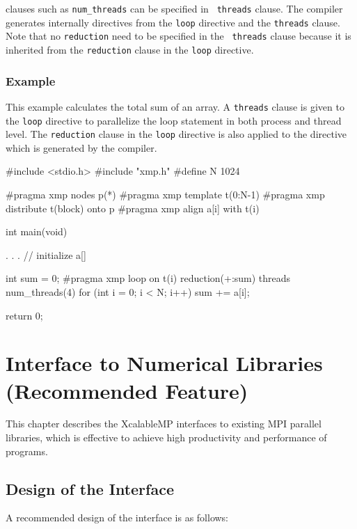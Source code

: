    {\OMP} clauses such as {\tt num\_threads} can be specified in {\tt
   threads} clause.
   The {\XMP} compiler generates internally {\OMP} directives from the
   {\tt loop} directive and the {\tt threads} clause.
   Note that no {\tt reduction} need to be specified in the {\tt
   threads} clause because it is inherited from the {\tt reduction}
   clause in the {\tt loop} directive.

\subsection*{Example}

   This example calculates the total sum of an array.
   A {\tt threads} clause is given to the {\tt loop} directive to
   parallelize the loop statement in both process and
   thread level. 
   The {\tt reduction} clause in the {\tt loop} directive is also
   applied to the {\OMP} directive which is generated by the {\XMP}
   compiler.

\begin{XCexample}
#include <stdio.h>
#include "xmp.h"
#define N 1024

#pragma xmp nodes p(*)
#pragma xmp template t(0:N-1)
#pragma xmp distribute t(block) onto p
#pragma xmp align a[i] with t(i)

int main(void) {
  . . . // initialize a[]

  int sum = 0;
#pragma xmp loop on t(i) reduction(+:sum) threads num_threads(4)
  for (int i = 0; i < N; i++) {
    sum += a[i];
  }

  return 0;
}
\end{XCexample}


\chapter{Interface to Numerical Libraries (Recommended Feature)}
\label{chap:Interface to Numerical Libraries}

   This chapter describes the XcalableMP interfaces to existing MPI
   parallel libraries, which is effective to achieve high productivity
   and performance of {\XMP} programs.
   
\section{Design of the Interface}

A recommended design of the interface is as follows:

